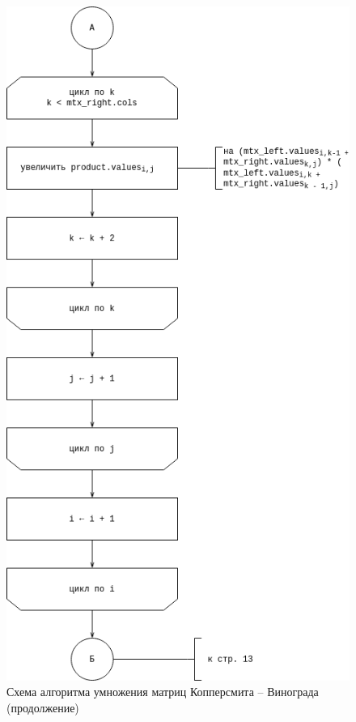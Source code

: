 \begin{figure}[H]
	\centering
	\includegraphics[width=0.7\linewidth]{assets/mtx-win2.drawio.png}
	\caption{Схема алгоритма умножения матриц Копперсмита -- Винограда (продолжение)}
	\label{fig:win-2}
\end{figure}

